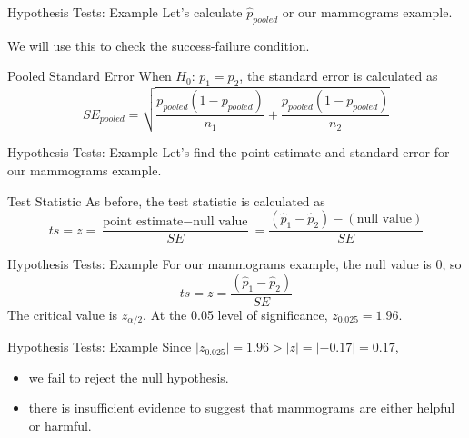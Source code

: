 \begin{frame}{Hypothesis Tests: Example}
    Let's calculate $\hat{p}_{pooled}$ or our mammograms example.
    
    \vspace{12pt}We will use this to check the success-failure condition.
\end{frame}

\begin{frame}{Pooled Standard Error}
    When $H_0$: $p_1=p_2$, the standard error is calculated as
    \[
        SE_{pooled} = \sqrt{\frac{p_{pooled}(1-p_{pooled})}{n_1} + \frac{p_{pooled}(1-p_{pooled})}{n_2}}
    \]
\end{frame}

\begin{frame}{Hypothesis Tests: Example}
    Let's find the point estimate and standard error for our mammograms example.
\end{frame}

\begin{frame}{Test Statistic}
    As before, the test statistic is calculated as
    \[
        ts = z = \frac{\text{point estimate} - \text{null value}}{SE} = \frac{(\hat{p}_1 - \hat{p}_2) - (\text{null value})}{SE}
    \]
\end{frame}

\begin{frame}{Hypothesis Tests: Example}
    For our mammograms example, the null value is 0, so
    \[
        ts = z = \frac{(\hat{p}_1 - \hat{p}_2)}{SE}
    \]
    The critical value is $z_{\alpha/2}$. At the 0.05 level of significance, $z_{0.025}=1.96$.
\end{frame}

\begin{frame}{Hypothesis Tests: Example}
    Since $|z_{0.025}| = 1.96 > |z| = |-0.17| = 0.17$,
    \begin{itemize}
        \item we fail to reject the null hypothesis.
        \item there is insufficient evidence to suggest that mammograms are either helpful or harmful.
    \end{itemize}
\end{frame}